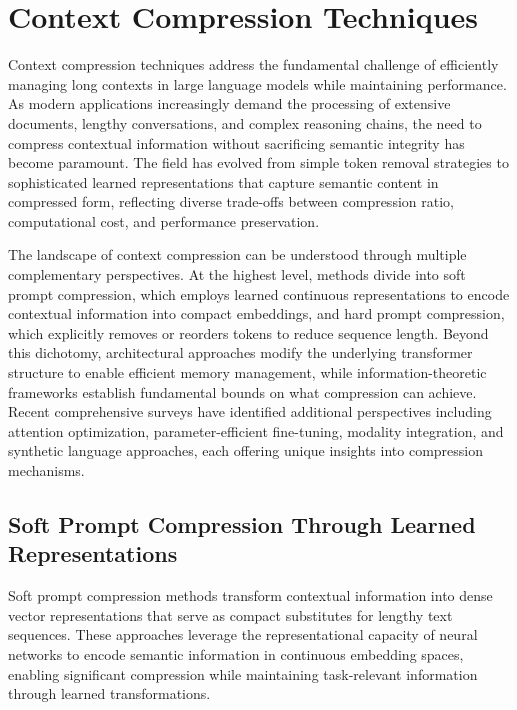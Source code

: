 \section{Context Compression Techniques}
\label{sec:compression}

Context compression techniques address the fundamental challenge of efficiently managing long contexts in large language models while maintaining performance. As modern applications increasingly demand the processing of extensive documents, lengthy conversations, and complex reasoning chains, the need to compress contextual information without sacrificing semantic integrity has become paramount. The field has evolved from simple token removal strategies to sophisticated learned representations that capture semantic content in compressed form, reflecting diverse trade-offs between compression ratio, computational cost, and performance preservation.

The landscape of context compression can be understood through multiple complementary perspectives. At the highest level, methods divide into soft prompt compression, which employs learned continuous representations to encode contextual information into compact embeddings, and hard prompt compression, which explicitly removes or reorders tokens to reduce sequence length. Beyond this dichotomy, architectural approaches modify the underlying transformer structure to enable efficient memory management, while information-theoretic frameworks establish fundamental bounds on what compression can achieve. Recent comprehensive surveys \citep{li2025prompt} have identified additional perspectives including attention optimization, parameter-efficient fine-tuning, modality integration, and synthetic language approaches, each offering unique insights into compression mechanisms.

\subsection{Soft Prompt Compression Through Learned Representations}

Soft prompt compression methods transform contextual information into dense vector representations that serve as compact substitutes for lengthy text sequences. These approaches leverage the representational capacity of neural networks to encode semantic information in continuous embedding spaces, enabling significant compression while maintaining task-relevant information through learned transformations.

